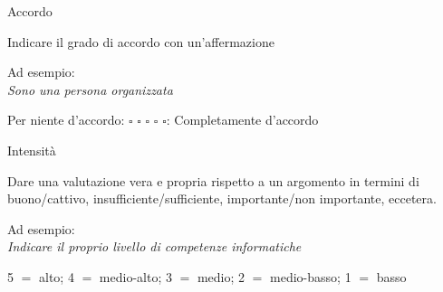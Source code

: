 \documentclass[compress]{beamer}
\begin{document}
\begin{frame}
	
	\begin{block}{Accordo}
		
		Indicare il grado di accordo con un'affermazione
		
		Ad esempio:\\
	\emph{Sono una persona organizzata} 
	\begin{center}
		Per niente d'accordo:	$\square$ \hspace{1.5mm} $\square$ \hspace{1.5mm} $\square$ \hspace{1.5mm} $\square$ \hspace{1.5mm} $\square$: Completamente d'accordo
	\end{center}
	\end{block}
	
		\begin{block}{Intensità}
		
	Dare una valutazione vera e propria rispetto a un argomento in termini di buono/cattivo, insufficiente/sufficiente, importante/non importante, eccetera. 
	
	Ad esempio: \\
	\emph{Indicare il proprio livello di competenze informatiche}
	\begin{center}
		5 $=$ alto; \hspace{1.5mm} 4 $=$ medio-alto; \hspace{1.5mm} 3 $=$ medio; \hspace{1.5mm} 2 $=$ medio-basso; \hspace{1.5mm} 1 $=$ basso
	\end{center}
	\end{block}
	

\end{frame}
\end{document}
